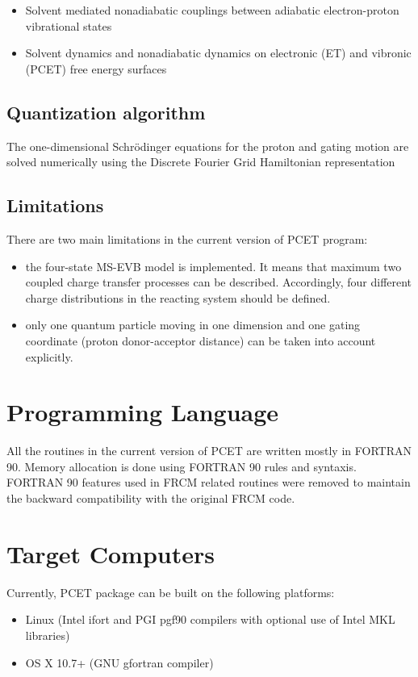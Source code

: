 \documentclass[oneside,11pt,openany]{book}
\begin{document}
\begin{itemize}
\item Solvent mediated nonadiabatic couplings between
      adiabatic electron-proton vibrational states

\item Solvent dynamics and nonadiabatic dynamics on
      electronic (ET) and vibronic (PCET) free energy surfaces

\end{itemize}

\subsection{Quantization algorithm}
The one-dimensional Schr\"odinger equations for the proton
and gating motion are solved numerically using the Discrete
Fourier Grid Hamiltonian representation \cite{Webb-DFGH}

\subsection{Limitations}

There are two main limitations in the current version of PCET
program:
\begin{itemize}
\item the four-state MS-EVB model is implemented. It means that
      maximum two coupled charge transfer processes can be
      described. Accordingly, four different charge
      distributions in the reacting system should be defined.
\item only one quantum particle moving in one dimension
      and one gating coordinate (proton donor-acceptor distance)
      can be taken into account explicitly.
\end{itemize}

\section{Programming Language}
All the routines in the current version of PCET are written
mostly in FORTRAN 90. Memory allocation is done using
FORTRAN 90 rules and syntaxis. FORTRAN 90 features
used in FRCM related routines were removed to maintain
the backward compatibility with the original FRCM code.

\section{Target Computers}
Currently, PCET package can be built on the following platforms:
\begin{itemize}
\item Linux (Intel ifort and PGI pgf90 compilers with optional use of Intel MKL libraries)
\item OS X 10.7+ (GNU gfortran compiler)
\end{itemize}
\end{document}
